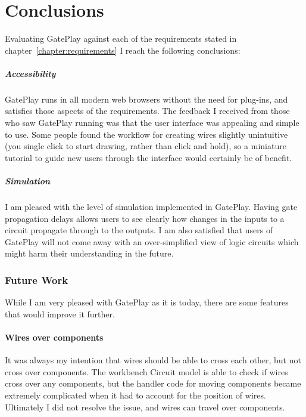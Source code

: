 \chapter{Conclusions}
Evaluating GatePlay against each of the requirements stated in chapter~\ref{chapter:requirements} I reach the following conclusions:

\paragraph{Accessibility}
GatePlay runs in all modern web browsers without the need for plug-ins, and satisfies those aspects of the requirements. The feedback I received from those who saw GatePlay running was that the user interface was appealing and simple to use. Some people found the workflow for creating wires slightly unintuitive (you single click to start drawing, rather than click and hold), so a miniature tutorial to guide new users through the interface would certainly be of benefit.

\paragraph{Simulation}
I am pleased with the level of simulation implemented in GatePlay. Having gate propagation delays allows users to see clearly how changes in the inputs to a circuit propagate through to the outputs. I am also satisfied that users of GatePlay will not come away with an over-simplified view of logic circuits which might harm their understanding in the future.

\subsection{Future Work}
While I am very pleased with GatePlay as it is today, there are some features that would improve it further.

\subsubsection{Wires over components}
It was always my intention that wires should be able to cross each other, but not cross over components. The workbench Circuit model is able to check if wires cross over any components, but the handler code for moving components became extremely complicated when it had to account for the position of wires. Ultimately I did not resolve the issue, and wires can travel over components.

